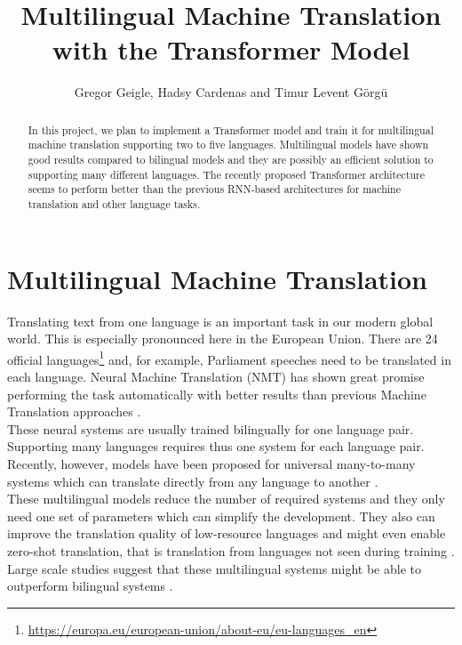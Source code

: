 \documentclass[article,accentcolor=tud8d,bibliography=totoc]{tudreport}
\title{Multilingual Machine Translation with the Transformer Model}
\subtitle{Gregor Geigle, Hadsy Cardenas and Timur Levent Görgü}
\begin{document}
\maketitle
\begin{abstract}
In this project, we plan to implement a Transformer model and train it for multilingual machine translation supporting two to five languages.
Multilingual models have shown good results compared to bilingual models and they are possibly an efficient solution to supporting many different languages. 
The recently proposed Transformer architecture seems to perform better than the previous RNN-based architectures for machine translation and other language tasks.
\end{abstract}  

\tableofcontents

\section{Multilingual Machine Translation}
Translating text from one language is an important task in our modern global world.
This is especially pronounced here in the European Union. 
There are 24 official languages\footnote{\url{https://europa.eu/european-union/about-eu/eu-languages_en}} and, for example, Parliament speeches need to be translated in each language.
Neural Machine Translation (NMT) has shown great promise performing the task automatically with better results than previous Machine Translation approaches \autocite{DBLP:journals/corr/WuSCLNMKCGMKSJL16}.\\
These neural systems are usually trained bilingually for one language pair.
Supporting many languages requires thus one system for each language pair.
Recently, however, models have been proposed for universal many-to-many systems which can translate directly from any language to another \autocite{DBLP:journals/corr/HaNW16,johnson2017google}.\\
These multilingual models reduce the number of required systems and they only need one set of parameters which can simplify the development. 
They also can improve the translation quality of low-resource languages and might even enable zero-shot translation, that is translation from languages not seen during training \autocite{DBLP:journals/corr/abs-1903-00089}.\\
Large scale studies suggest that these multilingual systems might be able to outperform bilingual systems \autocite{DBLP:journals/corr/abs-1806-06957,DBLP:journals/corr/abs-1903-00089}.
\end{document}

